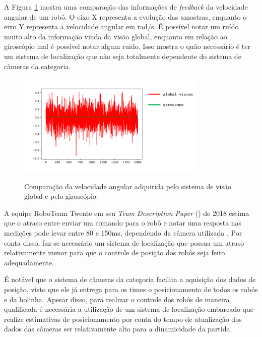 \documentclass[acronym, symbols, table, deposito]{fei}
\begin{document}
			A Figura \ref{fig:comparison_cameras_gyroscope} mostra uma comparação das informações de \textit{feedback} da velocidade angular de um robô. O eixo X representa a evolução das amostras, enquanto o eixo Y representa a velocidade angular em rad/s. É possível notar um ruído muito alto da informação vinda da visão global, enquanto em relação ao giroscópio mal é possível notar algum ruido. Isso mostra o quão necessário é ter um sistema de localização que não seja totalmente dependente do sistema de câmeras da categoria.
			
			\begin{figure}[!htb]
					\centering
					\caption{Comparação da velocidade angular adquirida pelo sistema de visão global e pelo giroscópio.} 
					\includegraphics[width=0.8\textwidth]{Comparacao_cameras_giroscopio.png}
					\label{fig:comparison_cameras_gyroscope}
				\end{figure}
		
			A equipe RoboTeam Twente em seu \textit{Team Description Paper} () de 2018 estima que o atraso entre enviar um comando para o robô e notar uma resposta nas medições pode levar entre 80 e 150ms, dependendo da câmera utilizada \cite{tdptwente2018}. Por conta disso, faz-se necessário um sistema de localização que possua um atraso relativamente menor para que o controle de posição dos robôs seja feito adequadamente.
			
			É notável que o sistema de câmeras da categoria  facilita a aquisição dos dados de posição, visto que ele já entrega para os times o posicionamento de todos os robôs e da bolinha. Apesar disso, para realizar o controle dos robôs de maneira qualificada é necessária a utilização de um sistema de localização embarcado que realize estimativas de posicionamento por conta do tempo de atualização dos dados das câmeras ser relativamente alto para a dinamicidade da partida.
			
\end{document}
